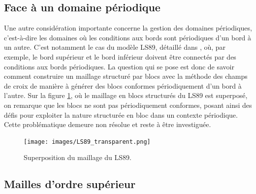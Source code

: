 \subsection*{Face à un domaine périodique}

Une autre considération importante concerne la gestion des domaines périodiques, c'est-à-dire les domaines où les conditions aux bords sont périodiques d'un bord à un autre. C'est notamment le cas du modèle LS89, détaillé dans \cite{gourdain2010advanced}, où, par exemple, le bord supérieur et le bord inférieur doivent être connectés par des conditions aux bords périodiques. La question qui se pose est donc de savoir comment construire un maillage structuré par blocs avec la méthode des champs de croix de manière à générer des blocs conformes périodiquement d'un bord à l'autre. Sur la figure \ref{LS89_transparent}, où le maillage en blocs structurés du LS89 est superposé, on remarque que les blocs ne sont pas périodiquement conformes, posant ainsi des défis pour exploiter la nature structurée en bloc dans un contexte périodique. Cette problématique demeure non résolue et reste à être investiguée.

\begin{figure}[!h]
\centering
\texttt{[image: images/LS89\_transparent.png]}
\caption{Superposition du maillage du LS89.}
\label{LS89_transparent}
\end{figure}


\subsection*{Mailles d'ordre supérieur}

